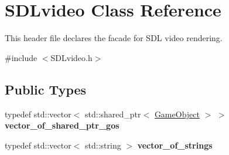 \hypertarget{class_s_d_lvideo}{}\section{S\+D\+Lvideo Class Reference}
\label{class_s_d_lvideo}


This header file declares the facade for S\+D\+L video rendering.  




{\ttfamily \#include $<$S\+D\+Lvideo.\+h$>$}

\subsection*{Public Types}
\begin{DoxyCompactItemize}
\item 
\hypertarget{class_s_d_lvideo_a6c44bc386fc88f9576e6fc3c14048aa7}{}typedef std\+::vector$<$ std\+::shared\+\_\+ptr$<$ \hyperlink{class_game_object}{Game\+Object} $>$ $>$ {\bfseries vector\+\_\+of\+\_\+shared\+\_\+ptr\+\_\+gos}\label{class_s_d_lvideo_a6c44bc386fc88f9576e6fc3c14048aa7}

\item 
\hypertarget{class_s_d_lvideo_ab8cfa7af7d08ef2e9e6d040c8504eb2f}{}typedef std\+::vector$<$ std\+::string $>$ {\bfseries vector\+\_\+of\+\_\+strings}\label{class_s_d_lvideo_ab8cfa7af7d08ef2e9e6d040c8504eb2f}

\end{DoxyCompactItemize}
